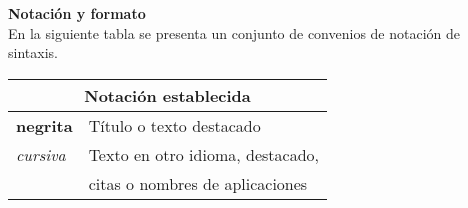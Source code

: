 \blankpage{}

\thispagestyle{prefacepage}
{\large \textbf{Notación y formato}} \smallskip
\vspace{0.5cm}\\
En la siguiente tabla se presenta un conjunto de convenios de notación de sintaxis.\smallskip
\vspace{0.5cm}
\begin{center}
    \begin{tabular}{|l|l|} \hline
        \multicolumn{2}{|c|}{Notación establecida} \\ \hline
        \textbf{negrita} & Título o texto destacado \\ \hline
        \textit{cursiva} & Texto en otro idioma, destacado, \\ & citas o nombres de aplicaciones \\ \hline
    \end{tabular}
\end{center}

